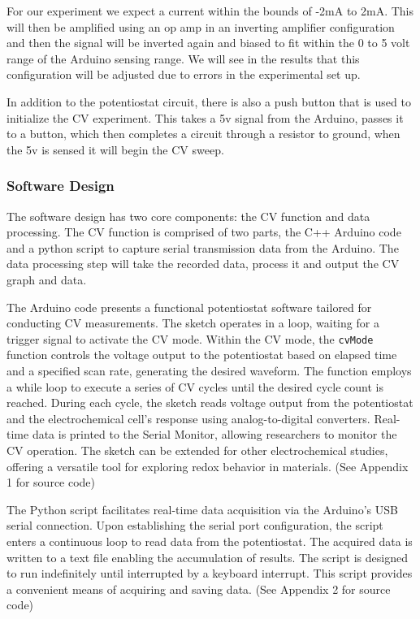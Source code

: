 \documentclass{article}
\begin{document}
For our experiment we expect a current within the bounds of -2mA to 2mA. This will then be amplified using an op amp in an inverting amplifier configuration and then the signal will be inverted again and biased to fit within the 0 to 5 volt range of the Arduino sensing range. We will see in the results that this configuration will be adjusted due to errors in the experimental set up.

In addition to the potentiostat circuit, there is also a push button that is used to initialize the CV experiment. This takes a 5v signal from the Arduino, passes it to a button, which then completes a circuit through a resistor to ground, when the 5v is sensed it will begin the CV sweep.

\subsubsection*{Software Design}

The software design has two core components: the CV function and data processing. The CV function is comprised of two parts, the C++ Arduino code and a python script to capture serial transmission data from the Arduino. The data processing step will take the recorded data, process it and output the CV graph and data.

The Arduino code presents a functional potentiostat software tailored for conducting CV measurements. The sketch operates in a loop, waiting for a trigger signal to activate the CV mode. Within the CV mode, the \texttt{cvMode} function controls the voltage output to the potentiostat based on elapsed time and a specified scan rate, generating the desired waveform. The function employs a while loop to execute a series of CV cycles until the desired cycle count is reached. During each cycle, the sketch reads voltage output from the potentiostat and the electrochemical cell's response using analog-to-digital converters. Real-time data is printed to the Serial Monitor, allowing researchers to monitor the CV operation. The sketch can be extended for other electrochemical studies, offering a versatile tool for exploring redox behavior in materials. (See Appendix 1 for source code)

The Python script facilitates real-time data acquisition via the Arduino's USB serial connection. Upon establishing the serial port configuration, the script enters a continuous loop to read data from the potentiostat. The acquired data is written to a text file enabling the accumulation of results. The script is designed to run indefinitely until interrupted by a keyboard interrupt. This script provides a convenient means of acquiring and saving data. (See Appendix 2 for source code)
\end{document}

